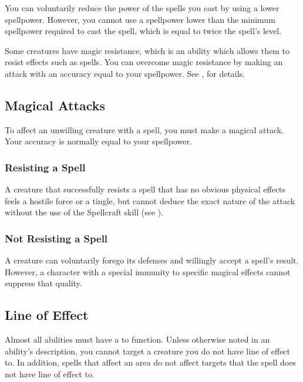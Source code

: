          You can voluntarily reduce the power of the spells you cast by using a lower spellpower.
        However, you cannot use a spellpower lower than the minimum spellpower required to cast the spell, which is equal to twice the spell's level.

         Some creatures have magic resistance, which is an ability which allows them to resist  effects such as spells.
        You can overcome magic resistance by making an attack with an accuracy equal to your spellpower.
        See , for details.

    \subsection{Magical Attacks}

        To affect an unwilling creature with a spell, you must make a magical attack.
        Your accuracy is normally equal to your spellpower.

        \subsubsection{Resisting a Spell} A creature that successfully resists a spell that has no obvious physical effects feels a hostile force or a tingle, but cannot deduce the exact nature of the attack without the use of the Spellcraft skill (see ).

        \subsubsection{Not Resisting a Spell} A creature can voluntarily forego its defenses and willingly accept a spell's result.
            However, a character with a special immunity to specific magical effects cannot suppress that quality.

    \subsection{Line of Effect}\label{Line of Effect}

        Almost all abilities must have a  to function.
        Unless otherwise noted in an ability's description, you cannot target a creature you do not have line of effect to.
        In addition, spells that affect an area do not affect targets that the spell does not have line of effect to.

